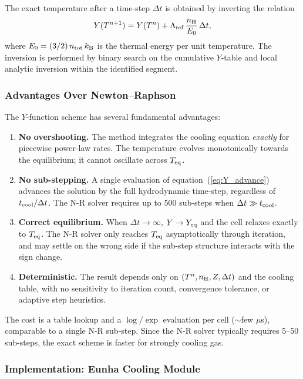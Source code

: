 \documentclass[fleqn,usenatbib]{mnras}
\begin{document}
The exact temperature after a time-step $\Delta t$ is obtained by
inverting the relation
\begin{equation}
  Y(T^{n+1}) = Y(T^n) + \Lambda_{\rm ref}\,\frac{n_{\rm H}}{E_0}\,\Delta t,
  \label{eq:Y_advance}
\end{equation}
where $E_0 = (3/2)\,n_{\rm tot}\,k_{\rm B}$ is the thermal energy per
unit temperature.  The inversion is performed by binary search on the
cumulative $Y$-table and local analytic inversion within the identified
segment.

\subsubsection{Advantages Over Newton--Raphson}

The $Y$-function scheme has several fundamental advantages:

\begin{enumerate}
  \item \textbf{No overshooting.}  The method integrates the cooling
    equation \emph{exactly} for piecewise power-law rates.  The
    temperature evolves monotonically towards the equilibrium; it cannot
    oscillate across $T_{\rm eq}$.
  \item \textbf{No sub-stepping.}  A single evaluation of
    equation~(\ref{eq:Y_advance}) advances the solution by the full
    hydrodynamic time-step, regardless of $t_{\rm cool}/\Delta t$.  The
    N-R solver requires up to 500 sub-steps when $\Delta t \gg t_{\rm cool}$.
  \item \textbf{Correct equilibrium.}  When $\Delta t \to \infty$,
    $Y \to Y_{\rm eq}$ and the cell relaxes exactly to $T_{\rm eq}$.
    The N-R solver only reaches $T_{\rm eq}$ asymptotically through
    iteration, and may settle on the wrong side if the sub-step
    structure interacts with the sign change.
  \item \textbf{Deterministic.}  The result depends only on
    $(T^n, n_{\rm H}, Z, \Delta t)$ and the cooling table, with no
    sensitivity to iteration count, convergence tolerance, or adaptive
    step heuristics.
\end{enumerate}

The cost is a table lookup and a $\log/\exp$ evaluation per cell
($\sim$few $\mu$s), comparable to a single N-R sub-step.  Since the N-R
solver typically requires 5--50 sub-steps, the exact scheme is faster
for strongly cooling gas.

\subsubsection{Implementation: Eunha Cooling Module}
\end{document}
